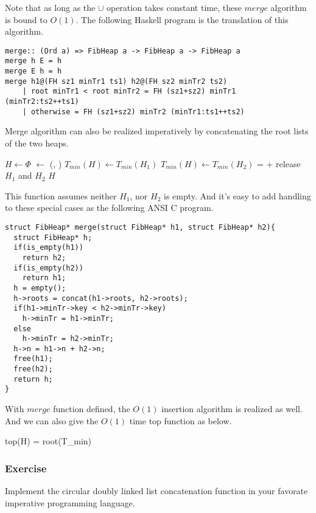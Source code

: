 \documentclass{article}
\begin{document}
Note that as long as the $\cup$ operation takes constant time, these
$merge$ algorithm is bound to $O(1)$. The following Haskell program
is the translation of this algorithm.

\lstset{language=Haskell}
\begin{lstlisting}
merge:: (Ord a) => FibHeap a -> FibHeap a -> FibHeap a
merge h E = h
merge E h = h
merge h1@(FH sz1 minTr1 ts1) h2@(FH sz2 minTr2 ts2) 
    | root minTr1 < root minTr2 = FH (sz1+sz2) minTr1 (minTr2:ts2++ts1)
    | otherwise = FH (sz1+sz2) minTr2 (minTr1:ts1++ts2)
\end{lstlisting}

Merge algorithm can also be realized imperatively by concatenating
the root lists of the two heaps.

\begin{algorithmic}
  \State $H \gets \Phi$
  \State {} $\gets$ (, )
    \State $T_{min}(H) \gets T_{min}(H_1)$
  \Else
    \State $T_{min}(H) \gets T_{min}(H_2)$
  \EndIf
   =  + 
  \State release $H_1$ and $H_2$
  \State \Return $H$
\EndFunction
\end{algorithmic}

This function assumes neither $H_1$, nor $H_2$ is empty. And it's easy
to add handling to these special cases as the following ANSI C program.

\lstset{language=C}
\begin{lstlisting}
struct FibHeap* merge(struct FibHeap* h1, struct FibHeap* h2){
  struct FibHeap* h;
  if(is_empty(h1))
    return h2;
  if(is_empty(h2))
    return h1;
  h = empty();
  h->roots = concat(h1->roots, h2->roots);
  if(h1->minTr->key < h2->minTr->key)
    h->minTr = h1->minTr;
  else
    h->minTr = h2->minTr;
  h->n = h1->n + h2->n;
  free(h1);
  free(h2);
  return h;
}
\end{lstlisting}

With $merge$ function defined, the $O(1)$ insertion algorithm is realized
as well. And we can also give the $O(1)$ time top function as below.

\be
top(H) = root(T_{min})
\ee

\subsubsection*{Exercise}
Implement the circular doubly linked list concatenation function in
your favorate imperative programming language.
\end{document}
